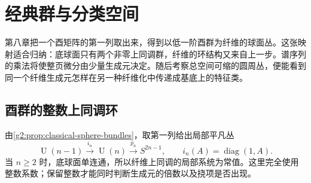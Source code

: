 
% 
% 

\section{经典群与分类空间}
\label{g2:sec:1104}

第八章把一个酉矩阵的第一列取出来，得到以低一阶酉群为纤维的球面丛。这张映射适合归纳：底球面只有两个非零上同调群，纤维的环结构又来自上一步。谱序列的乘法将使整页微分由少量生成元决定。随后考察总空间可缩的圆周丛，便能看到同一个纤维生成元怎样在另一种纤维化中传递成基底上的特征类。

\subsection{酉群的整数上同调环}
\label{g2:subsec:1104:01}

由\cref{g2:prop:classical-sphere-bundles}，取第一列给出局部平凡丛
\[
	\operatorname{U}(n-1)\xrightarrow{i_n}\operatorname{U}(n)\xrightarrow{p_n}S^{2n-1},
	\qquad i_n(A)=\operatorname{diag}(1,A).
\]
当 \(n\ge2\) 时，底球面单连通，所以纤维上同调的局部系统为常值。这里完全使用整数系数；保留整数才能同时判断生成元的倍数以及挠项是否出现。

